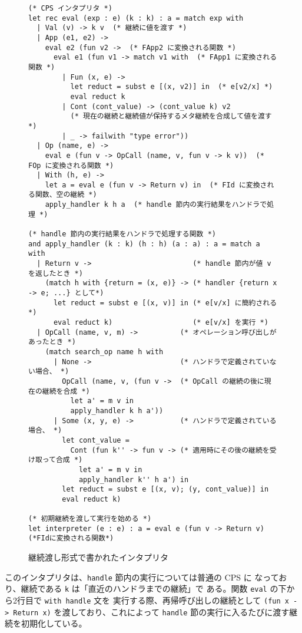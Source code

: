 \begin{figure}
\begin{verbatim}
(* CPS インタプリタ *)
let rec eval (exp : e) (k : k) : a = match exp with
  | Val (v) -> k v  (* 継続に値を渡す *)
  | App (e1, e2) ->
    eval e2 (fun v2 ->  (* FApp2 に変換される関数 *)
      eval e1 (fun v1 -> match v1 with  (* FApp1 に変換される関数 *)
        | Fun (x, e) ->
          let reduct = subst e [(x, v2)] in  (* e[v2/x] *)
          eval reduct k
        | Cont (cont_value) -> (cont_value k) v2
          (* 現在の継続と継続値が保持するメタ継続を合成して値を渡す *)
        | _ -> failwith "type error"))
  | Op (name, e) ->
    eval e (fun v -> OpCall (name, v, fun v -> k v))  (* FOp に変換される関数 *)
  | With (h, e) ->
    let a = eval e (fun v -> Return v) in  (* FId に変換される関数、空の継続 *)
    apply_handler k h a  (* handle 節内の実行結果をハンドラで処理 *)

(* handle 節内の実行結果をハンドラで処理する関数 *)
and apply_handler (k : k) (h : h) (a : a) : a = match a with
  | Return v ->                        (* handle 節内が値 v を返したとき *)
    (match h with {return = (x, e)} -> (* handler {return x -> e; ...} として*)
      let reduct = subst e [(x, v)] in (* e[v/x] に簡約される *)
      eval reduct k)                   (* e[v/x] を実行 *)
  | OpCall (name, v, m) ->          (* オペレーション呼び出しがあったとき *)
    (match search_op name h with
      | None ->                     (* ハンドラで定義されていない場合、 *)
        OpCall (name, v, (fun v ->  (* OpCall の継続の後に現在の継続を合成 *)
          let a' = m v in
          apply_handler k h a'))
      | Some (x, y, e) ->           (* ハンドラで定義されている場合、 *)
        let cont_value =
          Cont (fun k'' -> fun v -> (* 適用時にその後の継続を受け取って合成 *)
            let a' = m v in
            apply_handler k'' h a') in
        let reduct = subst e [(x, v); (y, cont_value)] in
        eval reduct k)

(* 初期継続を渡して実行を始める *)
let interpreter (e : e) : a = eval e (fun v -> Return v) (*FIdに変換される関数*)
\end{verbatim}
\caption{継続渡し形式で書かれたインタプリタ}
\label{figure:1cps}
\end{figure}

このインタプリタは、\texttt{handle} 節内の実行については普通の CPS に
なっており、継続である \texttt{k} は「直近のハンドラまでの継続」で
ある。関数 \texttt{eval} の下から2行目で \texttt{with handle} 文を
実行する際、再帰呼び出しの継続として
\texttt{(fun x -> Return x)} を渡しており、これによって
\texttt{handle} 節の実行に入るたびに渡す継続を初期化している。

